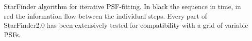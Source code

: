 StarFinder algorithm for iterative PSF-fitting. In black the sequence in time, in red the information flow between the individual steps. Every part of StarFinder2.0 has been extensively tested for compatibility with a grid of variable PSFs.
  
